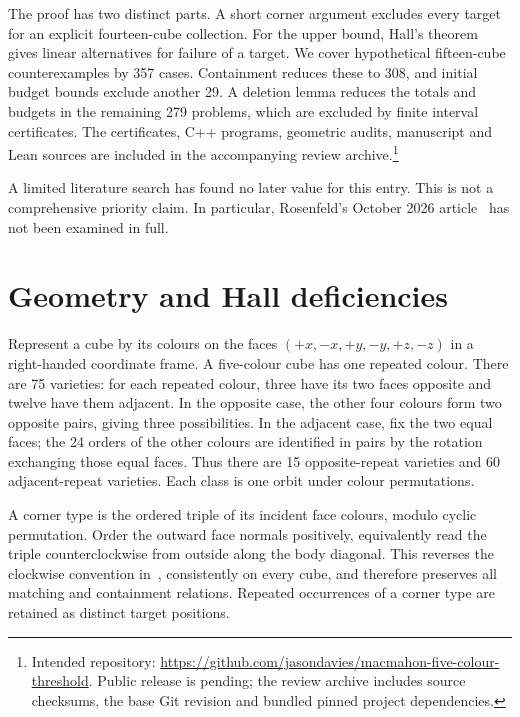 \documentclass[11pt]{article}
\theoremstyle{remark}
\begin{document}
The proof has two distinct parts. A short corner argument excludes every
target for an explicit fourteen-cube collection. For the upper bound,
Hall's theorem gives linear alternatives for failure of a target.
We cover hypothetical fifteen-cube counterexamples by 357 cases. Containment
reduces these to 308, and initial budget bounds exclude another 29. A deletion
lemma reduces the totals and budgets in the remaining 279 problems, which
are excluded by finite interval certificates. The
certificates, C++ programs, geometric audits, manuscript and Lean sources
are included in the accompanying review archive.\footnote{Intended repository:
\url{https://github.com/jasondavies/macmahon-five-colour-threshold}.
Public release is pending; the review archive includes source checksums,
the base Git revision and bundled pinned project dependencies.}

A limited literature search has found no later value for this entry.
This is not a comprehensive priority claim. In particular, Rosenfeld's
October 2026 article~\cite{Rosenfeld} has not been examined in full.

\section{Geometry and Hall deficiencies}\label{sec:model}
Represent a cube by its colours on the faces
$(+x,-x,+y,-y,+z,-z)$ in a right-handed coordinate frame. A five-colour cube
has one repeated colour. There are 75 varieties: for each repeated colour,
three have its two faces opposite and twelve have them adjacent. In the
opposite case, the other four colours form two opposite pairs, giving three
possibilities. In the adjacent case, fix the two equal faces; the 24 orders
of the other colours are identified in pairs by the rotation exchanging
those equal faces. Thus there are 15 opposite-repeat varieties and 60
adjacent-repeat varieties. Each class is one orbit under colour permutations.

A corner type is the ordered triple of its incident face colours, modulo
cyclic permutation. Order the outward face normals positively, equivalently
read the triple counterclockwise from outside along the body diagonal.
This reverses the clockwise convention in~\cite{BES}, consistently on every
cube, and therefore preserves all matching and containment relations.
Repeated occurrences of a corner type are retained as distinct target
positions.
\end{document}
